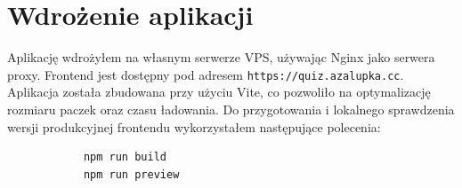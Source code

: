 \documentclass{article}
\begin{document}
    \section{Wdrożenie aplikacji}

        Aplikację wdrożyłem na własnym serwerze VPS, używając Nginx jako serwera proxy. Frontend jest dostępny pod adresem \texttt{https://quiz.azalupka.cc}. Aplikacja została zbudowana przy użyciu Vite, co pozwoliło na optymalizację rozmiaru paczek oraz czasu ładowania. Do przygotowania i lokalnego sprawdzenia wersji produkcyjnej frontendu wykorzystałem następujące polecenia:

        \begin{verbatim}
            npm run build
            npm run preview
        \end{verbatim}
\end{document}
